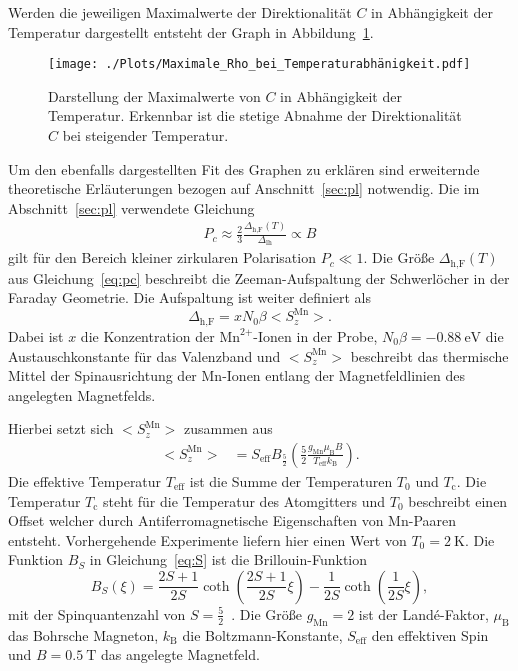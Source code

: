 Werden die jeweiligen Maximalwerte der Direktionalität $C$ in Abhängigkeit
der Temperatur dargestellt entsteht der Graph in Abbildung~\ref{fig:fit}.
\begin{figure}
    \centering
    \texttt{[image: ./Plots/Maximale\_Rho\_bei\_Temperaturabhänigkeit.pdf]}
    \caption{Darstellung der Maximalwerte von $C$ in Abhängigkeit der Temperatur.
    Erkennbar ist die stetige Abnahme der Direktionalität $C$ bei steigender Temperatur.}
    \label{fig:fit}
\end{figure}
\FloatBarrier

Um den ebenfalls dargestellten Fit des Graphen zu erklären
sind erweiternde theoretische Erläuterungen bezogen auf Anschnitt~\ref{sec:pl} notwendig.
Die im Abschnitt~\ref{sec:pl} verwendete Gleichung 
\begin{align*}
    P_c \approx \frac{2}{3} \frac{\Delta_\text{h,F}(T)}{\Delta_\text{lh}} \propto B
\end{align*}
gilt für den Bereich kleiner zirkularen Polarisation $P_{c}\ll 1$. 
Die Größe $\Delta_\text{h,F}(T)$ aus Gleichung~\ref{eq:pc} beschreibt die 
Zeeman-Aufspaltung der Schwerlöcher in der Faraday Geometrie.
Die Aufspaltung ist weiter definiert als 
\begin{equation}
    \Delta_\text{h,F} = xN_0\beta \bigl< S^\text{Mn}_{z} \bigr>.
\end{equation}
Dabei ist $x$ die Konzentration der $\text{Mn}^\text{2+}\text{-Ionen}$ in der Probe,
$N_0\beta = -\SI{0.88}{\eV}$ die Austauschkonstante für das Valenzband und 
$\bigl< S^\text{Mn}_{z} \bigr>$ beschreibt das thermische Mittel der Spinausrichtung
der Mn-Ionen entlang der Magnetfeldlinien des angelegten Magnetfelds.

Hierbei setzt sich $\bigl< S^\text{Mn}_{z} \bigr>$ zusammen aus 
\begin{align}
    \label{eq:S}
    \bigl< S^\text{Mn}_{z} \bigr> &= S_\text{eff} B_\text{$\frac{5}{2}$} \left(\frac{5}{2}\frac{g_\text{Mn} \mu_\text{B} B }{T_\text{eff} k_\text{B}} \right)\text{.}
\end{align}
Die effektive Temperatur $T_\text{eff}$ ist die Summe der Temperaturen $T_0$ und $T_\text{c}$.
Die Temperatur $T_\text{c}$
steht für die Temperatur des Atomgitters und $T_0$ beschreibt einen Offset welcher durch Antiferromagnetische Eigenschaften
von Mn-Paaren entsteht. Vorhergehende Experimente liefern hier einen Wert von $T_0=\SI{2}{\kelvin}$.
Die Funktion $B_{S}$ in Gleichung~\ref{eq:S} ist die Brillouin-Funktion 
\begin{equation}
    B_{S}(\xi) = \frac{2S+1}{2S}\coth\left(\frac{2S+1}{2S}\xi\right) - \frac{1}{2S}\coth(\frac{1}{2S}\xi),
\end{equation}
mit der Spinquantenzahl von $ S = \frac{5}{2}$~\cite{felix}.
Die Größe $g_\text{Mn} = 2 $ ist der Landé-Faktor, $\mu_\text{B}$ das Bohrsche Magneton,
$k_\text{B}$ die Boltzmann-Konstante, $S_\text{eff}$ den effektiven Spin und $B=\SI{0,5}{\tesla} $ das angelegte Magnetfeld.

